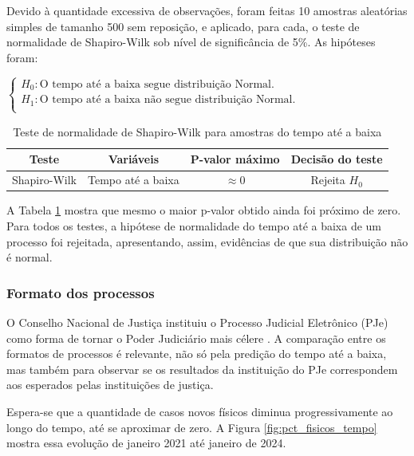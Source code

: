 Devido à quantidade excessiva de observações, foram feitas 10 amostras aleatórias simples de tamanho 500 sem reposição, e aplicado, para cada, o teste de normalidade de Shapiro-Wilk sob nível de significância de 5\%. As hipóteses foram:

$\begin{cases}
H_{0}: \mbox{O tempo até a baixa segue distribuição Normal.} \\
H_{1}: \mbox{O tempo até a baixa não segue distribuição Normal.}  \\
\end{cases}
$\\

\begin{table}[H]
\centering
\caption{Teste de normalidade de Shapiro-Wilk para amostras do tempo até a baixa}
\begin{tabular}{cccc}
\hline
\textbf{Teste} & \textbf{Variáveis} & \textbf{P-valor máximo} & \textbf{Decisão do teste} \\ \hline
Shapiro-Wilk & Tempo até a baixa & $\approx 0$   & Rejeita $H_0$  \\ \hline  
\end{tabular}
\label{teste:normalidade_tempo}
\end{table}

A Tabela \ref{teste:normalidade_tempo} mostra que mesmo o maior p-valor obtido ainda foi próximo de zero. Para todos os testes, a hipótese de normalidade do tempo até a baixa de um processo foi rejeitada, apresentando, assim, evidências de que sua distribuição não é normal.


\subsubsection{Formato dos processos}\label{sec:formato}
O Conselho Nacional de Justiça instituiu o Processo Judicial Eletrônico (PJe) como forma de tornar o Poder Judiciário mais célere \cite{pje}. A comparação entre os formatos de processos é relevante, não só pela predição do tempo até a baixa, mas também para observar se os resultados da instituição do PJe correspondem aos esperados pelas instituições de justiça.

Espera-se que a quantidade de casos novos físicos diminua progressivamente ao longo do tempo, até se aproximar de zero. A Figura \ref{fig:pct_fisicos_tempo} mostra essa evolução de janeiro 2021 até janeiro de 2024.


